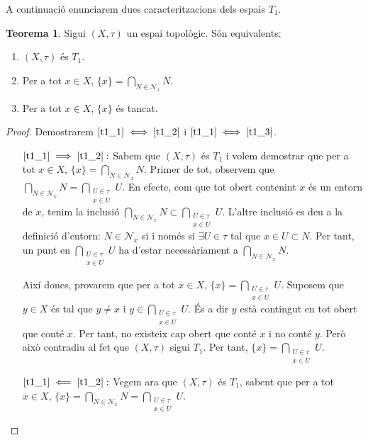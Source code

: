 \documentclass[10pt,a4paper]{article}
\theoremstyle{definition}
\newtheorem{theorem}{Teorema}[section]
\begin{document}
A continuació enunciarem dues caracteritzacions dels espais $T_1$.
\begin{theorem}\label{theorem2}
      Sigui $(X,\tau)$ un espai topològic. Són equivalents:
      \begin{enumerate}
            \item\label{t1_1} $(X,\tau)$ és $T_1$.
            \item\label{t1_2} Per a tot $x\in X$, $\{x\}=\bigcap_{N\in \mathcal{N}_x}N$.
            \item\label{t1_3} Per a tot $x\in X$, $\{x\}$ és tancat.
      \end{enumerate}
\end{theorem}
\begin{proof}
      Demostrarem $\ref{t1_1}\iff\ref{t1_2}$ i $\ref{t1_1}\iff\ref{t1_3}$.
      \begin{itemize}[leftmargin=2cm]
            \item [$\ref{t1_1}\implies\ref{t1_2}:$] Sabem que $(X,\tau)$ és $T_1$ i volem demostrar que per a tot $x\in X$, $\{x\}=\bigcap_{N\in \mathcal{N}_x}N$. Primer de tot, observem que $\bigcap_{N\in \mathcal{N}_x}N=\bigcap_{\substack{U\in \tau\\x\in U}}U$. En efecte, com que tot obert contenint $x$ és un entorn de $x$, tenim la inclusió $\bigcap_{N\in \mathcal{N}_x}N\subset\bigcap_{\substack{U\in \tau\\x\in U}}U$. L'altre inclusió es deu a la definició d'entorn: $N\in\mathcal{N}_x$ si i només si $\exists U\in\tau$ tal que $x\in U\subset N$. Per tant, un punt en $\bigcap_{\substack{U\in \tau\\x\in U}}U$ ha d'estar necessàriament a $\bigcap_{N\in \mathcal{N}_x}N$.

                  Així doncs, provarem que per a tot $x\in X$, $\{x\}=\bigcap_{\substack{U\in \tau\\x\in U}}U$. Suposem que $y\in X$ és tal que $y\ne x$ i $y\in\bigcap_{\substack{U\in \tau\\x\in U}}U$. És a dir $y$ està contingut en tot obert que conté $x$. Per tant, no existeix cap obert que conté $x$ i no conté $y$. Però això contradiu al fet que $(X,\tau)$ sigui $T_1$. Per tant, $\{x\}=\bigcap_{\substack{U\in \tau\\x\in U}}U$.
            \item [$\ref{t1_1}\impliedby\ref{t1_2}:$] Vegem ara que $(X,\tau)$ és $T_1$, sabent que per a tot $x\in X$, $\{x\}=\bigcap_{N\in \mathcal{N}_x}N=\bigcap_{\substack{U\in \tau\\x\in U}}U$.


\end{itemize}
\end{proof}
\end{document}
